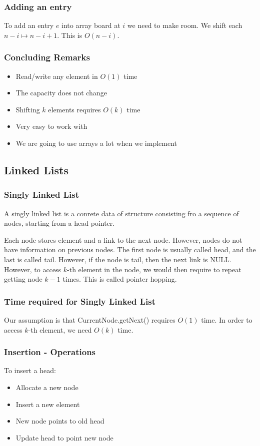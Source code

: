 \documentclass[a4paper]{article}
\theoremstyle{plain}
\theoremstyle{definition}
\newtheorem{defn}{Definition}[section]
\theoremstyle{remark}
\begin{document}
\subsubsection{Adding an entry}
To add an entry $e$ into array board at $i$ we need to make room. We shift each $n-i \mapsto n-i+1$. This is $O(n-i)$.
\subsubsection{Concluding Remarks}
\begin{itemize}
	\item Read/write any element in $O(1)$ time
	\item The capacity does not change
	\item Shifting $k$ elements requires $O(k)$ time
	\item Very easy to work with
	\item We are going to use arrays a lot when we implement
\end{itemize}
\subsection{Linked Lists}
\subsubsection{Singly Linked List}
\begin{tcolorbox}[colback=black!3!white,colframe=black!60!white,title=\begin{defn}Singly Linked List \label{Singly Linked List}\end{defn}]
A singly linked list is a conrete data of structure consisting fro a sequence of nodes, starting from a head pointer.
\end{tcolorbox}
Each node stores element and a link to the next node. However, nodes do not have information on previous nodes. The first node is usually called head, and the last is called tail. However, if the node is tail, then the next link is NULL. However, to access $k$-th element in the node, we would then require to repeat getting node $k-1$ times. This is called pointer hopping.
\subsubsection{Time required for Singly Linked List}
Our assumption is that CurrentNode.getNext() requires $O(1)$ time. In order to access $k$-th element, we need $O(k)$ time.
\subsubsection{Insertion - Operations}
To insert a head:
\begin{itemize}
	\item Allocate a new node
	\item Insert a new element
	\item New node points to old head
	\item Update head to point new node
\end{itemize}
\end{document}
